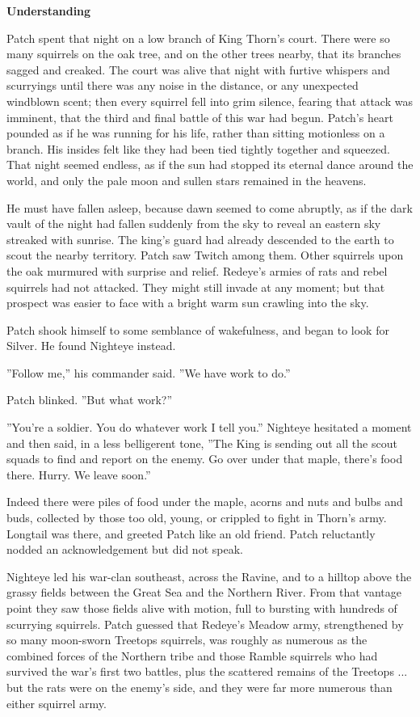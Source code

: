 \documentclass[11pt]{article}
\begin{document}
\par
{\bf Understanding\par
}\par
 Patch spent that night on a low branch of King Thorn's court. There were so many squirrels on the oak tree, and on the other trees nearby, that its branches sagged and creaked. The court was alive that night with furtive whispers and scurryings %
 until there was any noise in the distance, or any unexpected windblown scent; then every squirrel fell into grim silence, fearing that attack was imminent, that the third and final battle of this war had begun. Patch's heart pounded as if he was running for his life, rather than sitting motionless on a branch. His insides felt like they had been tied tightly together and squeezed. That night seemed endless, as if the sun had stopped its eternal dance around the world, and only the pale moon and sullen stars remained in the heavens.\par
 He must have fallen asleep, because dawn seemed to come abruptly, as if the dark vault of the night had fallen suddenly from the sky to reveal an eastern sky streaked with sunrise. The king's guard had already descended to the earth to scout the nearby territory. Patch saw Twitch among them. Other squirrels upon the oak murmured with surprise and relief. Redeye's armies of rats and rebel squirrels had not attacked. They might still invade at any moment; but that prospect was easier to face with a bright warm sun crawling into the sky.\par
 Patch shook himself to some semblance of wakefulness, and began to look for Silver. He found Nighteye instead.\par
 ''Follow me,'' his commander said. ''We have work to do.''\par
 Patch blinked. ''But %
 what work?''\par
 ''You're a soldier. You do whatever work I tell you.'' Nighteye hesitated a moment and then said, in a less belligerent tone, ''The King is sending out all the scout squads to find and report on the enemy. Go over under that maple, there's food there. Hurry. We leave soon.''\par
 Indeed there were piles of food under the maple, acorns and nuts and bulbs and buds, collected by those too old, young, or crippled to fight in Thorn's army. Longtail was there, and greeted Patch like an old friend. Patch reluctantly nodded an acknowledgement but did not speak.\par
 Nighteye led his war-clan southeast, across the Ravine, and to a hilltop above the grassy fields between the Great Sea and the Northern River. From that vantage point they saw those fields alive with motion, full to bursting with hundreds of scurrying squirrels. Patch guessed that Redeye's Meadow army, strengthened by so many moon-sworn Treetops squirrels, was roughly as numerous as the combined forces of the Northern tribe and those Ramble squirrels who had survived the war's first two battles, plus the scattered remains of the Treetops ... but the rats were on the enemy's side, and they were far more numerous than either squirrel army.\par
\end{document}
